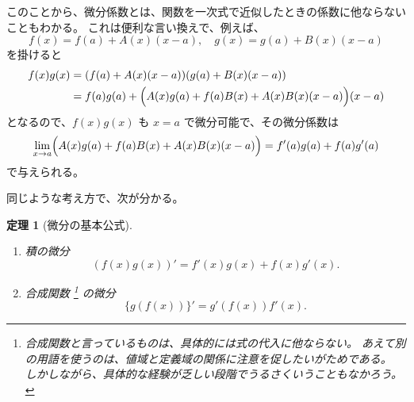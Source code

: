 \documentclass[a4paper]{jsarticle}
\newtheorem{Theorem}{定理}[section]
\theoremstyle{definition}
\theoremstyle{remark}
\begin{document}
このことから、微分係数とは、関数を一次式で近似したときの係数に他ならないこともわかる。
これは便利な言い換えで、例えば、
\[
  f(x) = f(a) + A(x)(x-a), \quad
  g(x) = g(a) + B(x)(x-a)
\]
を掛けると
\begin{align*}
  f(x)g(x) &= (f(a) + A(x)(x-a))(g(a) + B(x)(x-a))\\
  &= f(a) g(a) + \Bigl(A(x) g(a) +f(a) B(x) + A(x)B(x)(x-a)\Bigr)(x-a)
\end{align*}
となるので、$f(x)g(x)$ も $x=a$ で微分可能で、その微分係数は
\[
  \lim_{x\to a} \Bigl( A(x) g(a) +f(a) B(x) + A(x)B(x)(x-a) \Bigr)
  = f'(a)g(a) + f(a) g'(a)
\]
で与えられる。


同じような考え方で、次が分かる。

\begin{Theorem}[微分の基本公式]~
\begin{enumerate}
\item
積の微分
\[
(f(x)g(x))' = f'(x)g(x) + f(x)g'(x).
\]
\item
合成関数
\footnote{
合成関数と言っているものは、具体的には式の代入に他ならない。
あえて別の用語を使うのは、値域と定義域の関係に注意を促したいがためである。
しかしながら、具体的な経験が乏しい段階でうるさくいうこともなかろう。
}  
の微分
\[
\{g(f(x))\}' = g'(f(x))f'(x).
\]
\end{enumerate}
\end{Theorem}
\end{document}

